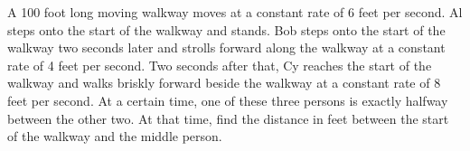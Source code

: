 A 100 foot long moving walkway moves at a constant rate of 6 feet per second.  Al steps onto the start of the walkway and stands.  Bob steps onto the start of the walkway two seconds later and strolls forward along the walkway at a constant rate of 4 feet per second.  Two seconds after that, Cy reaches the start of the walkway and walks briskly forward beside the walkway at a constant rate of 8 feet per second.  At a certain time, one of these three persons is exactly halfway between the other two.  At that time, find the distance in feet between the start of the walkway and the middle person.